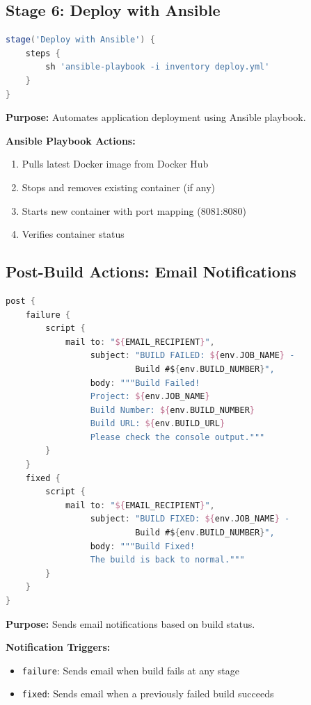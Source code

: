 \documentclass[12pt,a4paper]{article}
\begin{document}
\subsection{Stage 6: Deploy with Ansible}

\begin{lstlisting}[language=Groovy, caption=Ansible Deployment Stage]
stage('Deploy with Ansible') {
    steps {
        sh 'ansible-playbook -i inventory deploy.yml'
    }
}
\end{lstlisting}

\textbf{Purpose:} Automates application deployment using Ansible playbook.

\textbf{Ansible Playbook Actions:}
\begin{enumerate}
    \item Pulls latest Docker image from Docker Hub
    \item Stops and removes existing container (if any)
    \item Starts new container with port mapping (8081:8080)
    \item Verifies container status
\end{enumerate}

\subsection{Post-Build Actions: Email Notifications}

\begin{lstlisting}[language=Groovy, caption=Email Notification Configuration]
post {
    failure {
        script {
            mail to: "${EMAIL_RECIPIENT}",
                 subject: "BUILD FAILED: ${env.JOB_NAME} -
                          Build #${env.BUILD_NUMBER}",
                 body: """Build Failed!
                 Project: ${env.JOB_NAME}
                 Build Number: ${env.BUILD_NUMBER}
                 Build URL: ${env.BUILD_URL}
                 Please check the console output."""
        }
    }
    fixed {
        script {
            mail to: "${EMAIL_RECIPIENT}",
                 subject: "BUILD FIXED: ${env.JOB_NAME} -
                          Build #${env.BUILD_NUMBER}",
                 body: """Build Fixed!
                 The build is back to normal."""
        }
    }
}
\end{lstlisting}

\textbf{Purpose:} Sends email notifications based on build status.

\textbf{Notification Triggers:}
\begin{itemize}
    \item \texttt{failure}: Sends email when build fails at any stage
    \item \texttt{fixed}: Sends email when a previously failed build succeeds
\end{itemize}
\end{document}
